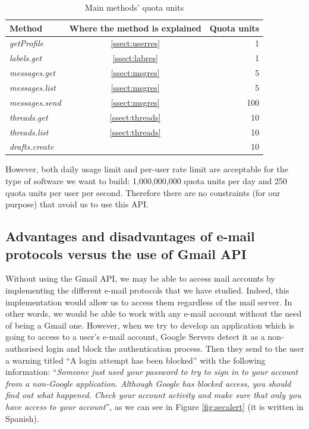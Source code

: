 \begin{table}[h]
	\centering
	\begin{tabular}{|l c r|}
		\hline
		\textbf{Method} & \textbf{Where the method is explained} & \textbf{Quota units} \\
		\hline\hline
		\textit{getProfile} & \ref{ssect:userres} & 1\\ \hline
		\textit{labels.get} & \ref{ssect:labres} & 1\\ \hline
		\textit{messages.get} & \ref{ssect:msgres} & 5\\ \hline
		\textit{messages.list} & \ref{ssect:msgres} & 5\\ \hline
		\textit{messages.send} & \ref{ssect:msgres} & 100\\ \hline
		\textit{threads.get} & \ref{ssect:threads} & 10\\ \hline
		\textit{threads.list} & \ref{ssect:threads} & 10\\ \hline
		\textit{drafts.create} & \citep[/v1/reference/users/drafts]{gmailAPI} & 10\\ \hline
	\end{tabular}
	\caption{Main methods' quota units}
	\label{tab:quotaUnits}
\end{table}

However, both daily usage limit and per-user rate limit are acceptable for the type of software we want to build: 1,000,000,000 quota units per day and 250 quota units per user per second. Therefore there are no constraints (for our purpose) that avoid us to use this API.

\subsection{Advantages and disadvantages of e-mail protocols versus the use of Gmail API} \label{ssect:protvsapi}
Without using the Gmail API, we may be able to access mail accounts by implementing the different e-mail protocols that we have studied. Indeed, this implementation would allow us to access them regardless of the mail server. In other words, we would be able to work with any e-mail account without the need of being a Gmail one. However, when we try to develop an application which is going to access to a user's e-mail account, Google Servers detect it as a non-authorised login and block the authentication process. Then they send to the user a warning titled ``A login attempt has been blocked'' with the following information: ``\textit{Someone just used your password to try to sign in to your account from a non-Google application. Although Google has blocked access, you should find out what happened. Check your account activity and make sure that only you have access to your account}'', as we can see in Figure \ref{fig:secalert} (it is written in Spanish).

